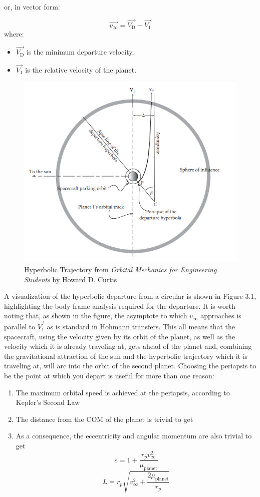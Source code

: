 \documentclass{article}
\numberwithin{figure}{section}
\begin{document}
or, in vector form:

\[
\vec{v_\infty}=\vec{V_{\text{D}}}-\vec{V_1}
\]
where:
\begin{itemize}
    \item \(\vec{V_{\text{D}}}\) is the minimum departure velocity,
    \item \(\vec{V_1}\) is the relative velocity of the planet.
\end{itemize}

\begin{figure}
    \centering
    \includegraphics[width=0.5\linewidth]{v infinite.png}
    \caption{Hyperbolic Trajectory from \textit{Orbital Mechanics for Engineering Students} by Howard D. Curtis}
    \label{fig:enter-label}
\end{figure}

A visualization of the hyperbolic departure from a circular is shown in Figure 3.1, highlighting the body frame analysis required for the departure. It is worth noting that, as shown in the figure, the asymptote to which \(v_\infty\) approaches is parallel to \(\vec{V_1}\) as is standard in Hohmann transfers. This all means that the spacecraft, using the velocity given by its orbit of the planet, as well as the velocity which it is already traveling at, gets ahead of the planet and, combining the gravitational attraction of the sun and the hyperbolic trajectory which it is traveling at, will arc into the orbit of the second planet. Choosing the periapsis to be the point at which you depart is useful for more than one reason:
\begin{enumerate}
    \item The maximum orbital speed is achieved at the periapsis, according to Kepler's Second Law
    \item The distance from the COM of the planet is trivial to get
    \item As a consequence, the eccentricity and angular momentum are also trivial to get
    \[e = 1 + \frac{r_p v_\infty^2}{\mu_{\text{planet}}}\]
    \[L = r_p \sqrt{v_\infty^2 + \frac{2 \mu_{\text{planet}}}{r_p}}\]
\end{enumerate}
\end{document}
